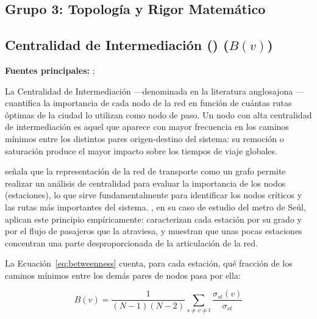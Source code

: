 
\subsection*{Grupo 3: Topología y Rigor Matemático}

\subsection{Centralidad de Intermediación () \texorpdfstring{($B(v)$)}{(B(v))}}
\label{subsec:centralidad-intermediacion}

\textbf{Fuentes principales:} \citet{lee2008}; \citet{allauca2023}

La Centralidad de Intermediación ---denominada en la literatura anglosajona
--- cuantifica la importancia de cada nodo de la
red en función de cuántas rutas óptimas de la ciudad lo utilizan como nodo de
paso. Un nodo con alta centralidad de intermediación es aquel que aparece con
mayor frecuencia en los caminos mínimos entre los distintos pares origen-destino
del sistema: su remoción o saturación produce el mayor impacto sobre los tiempos
de viaje globales.

\citet{allauca2023} señala que la representación de la red de transporte como un
grafo permite realizar un análisis de centralidad para evaluar la importancia de
los nodos (estaciones), lo que sirve fundamentalmente para identificar los nodos
críticos y las rutas más importantes del sistema. \citet{lee2008}, en su caso de
estudio del metro de Seúl, aplican este principio empíricamente: caracterizan
cada estación por su grado y por el flujo de pasajeros que la atraviesa, y
muestran que unas pocas estaciones concentran una parte desproporcionada de la
articulación de la red.

La Ecuación~\eqref{eq:betweenness} cuenta, para cada estación, qué fracción de
los caminos mínimos entre los demás pares de nodos pasa por ella:

\begin{equation}
    B(v) = \frac{1}{(N-1)(N-2)} \sum_{s \neq v \neq t} \frac{\sigma_{st}(v)}{\sigma_{st}}
    \label{eq:betweenness}
\end{equation}

